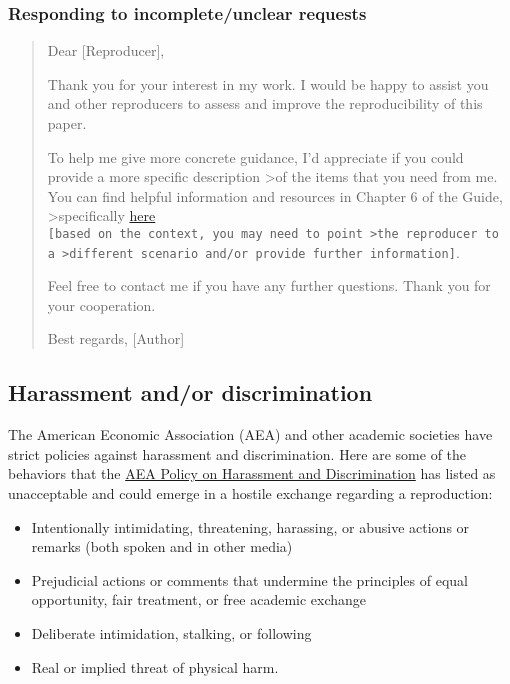 \subsubsection{Responding to incomplete/unclear
requests}

\begin{quote}
Dear {[}Reproducer{]},

Thank you for your interest in my work. I would be happy to assist you
and other reproducers to assess and improve the reproducibility of this
paper.

To help me give more concrete guidance, I'd appreciate if you could
provide a more specific description \textgreater of the items that you
need from me. You can find helpful information and resources in Chapter
6 of the Guide, \textgreater specifically
\href{https://bitss.github.io/ACRE/guidance-for-a-constructive-exchange-between-reproducers-and-original-authors.html\#asking-for-additional-guidance-when-some-materials-have-been-shared}{here}
\texttt{{[}based\ on\ the\ context,\ you\ may\ need\ to\ point\ \textgreater{}the\ reproducer\ to\ a\ \textgreater{}different\ scenario\ and/or\ provide\ further\ information{]}}.

Feel free to contact me if you have any further questions. Thank you for
your cooperation.

Best regards, {[}Author{]}
\end{quote}

\subsection{Harassment and/or
discrimination}
The American Economic Association (AEA) and other academic societies
have strict policies against harassment and discrimination. Here are
some of the behaviors that the
\href{https://www.aeaweb.org/about-aea/aea-policy-harassment-discrimination}{AEA
Policy on Harassment and Discrimination} has listed as unacceptable and
could emerge in a hostile exchange regarding a reproduction:

\begin{itemize}
\tightlist
\item
  Intentionally intimidating, threatening, harassing, or abusive actions
  or remarks (both spoken and in other media)
\item
  Prejudicial actions or comments that undermine the principles of equal
  opportunity, fair treatment, or free academic exchange
\item
  Deliberate intimidation, stalking, or following
\item
  Real or implied threat of physical harm.
\end{itemize}

